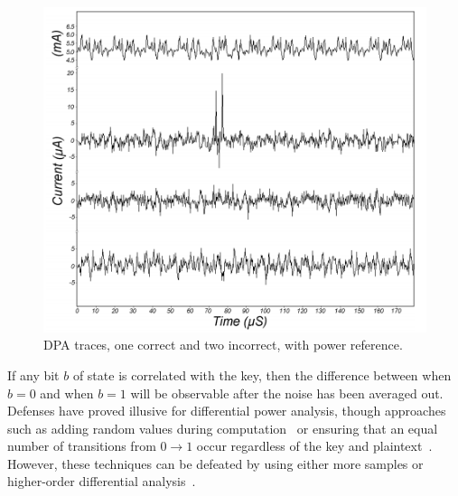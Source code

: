 \documentclass{article}
\begin{document}
\begin{figure}
\includegraphics[scale=.7]{dpaTrace}
\caption{DPA traces, one correct and two incorrect, with power reference.}
\label{fig:dpa trace}
\end{figure}


If any bit $b$ of state is correlated with the key, then the difference between when $b=0$ and when $b=1$ will be observable after the noise has been averaged out.  Defenses have proved illusive for differential power analysis, though approaches such as adding random values during computation~\cite{messergesMasking} or ensuring that an equal number of transitions from $0\rightarrow 1$ occur regardless of the key and plaintext~\cite{poppMangardDualRail}.  However, these techniques can be defeated by using either more samples or higher-order differential analysis~\cite{joyeSecondOrderDPA}.



\end{document}
